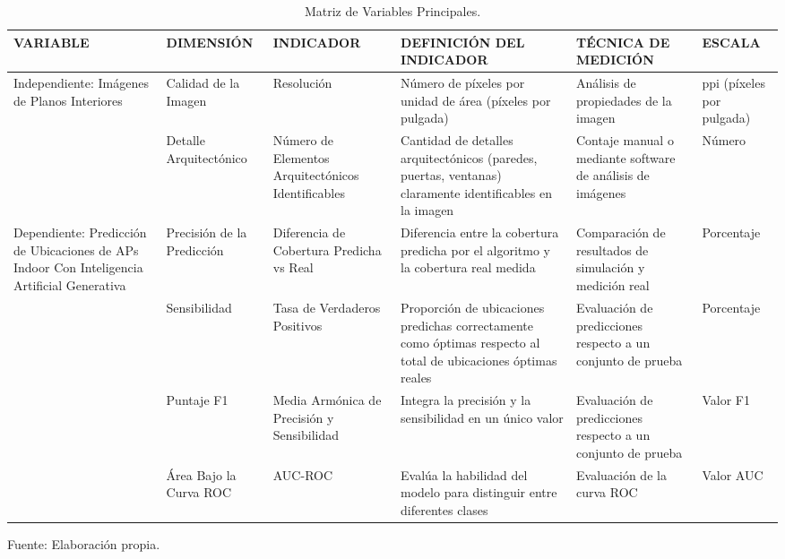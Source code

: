 \begin{longtable}{>{\raggedright\arraybackslash}m{3cm} >{\raggedright\arraybackslash}m{2cm} >{\raggedright\arraybackslash}m{2cm} >{\raggedright\arraybackslash}m{3cm} >{\raggedright\arraybackslash}m{2cm} >{\raggedright\arraybackslash}m{2.5cm}}
    \caption{Matriz de Variables Principales.}
    \label{tabla:variables}\\
    \hline
    VARIABLE & DIMENSIÓN & INDICADOR & DEFINICIÓN DEL INDICADOR & TÉCNICA DE MEDICIÓN & ESCALA \\
    \hline
    Independiente: Imágenes de Planos Interiores & Calidad de la Imagen & Resolución & Número de píxeles por unidad de área (píxeles por pulgada) & Análisis de propiedades de la imagen & ppi (píxeles por pulgada) \\
    \cline{2-6}
     & Detalle Arquitectónico & Número de Elementos Arquitectónicos Identificables & Cantidad de detalles arquitectónicos (paredes, puertas, ventanas) claramente identificables en la imagen & Contaje manual o mediante software de análisis de imágenes & Número \\
    \hline
    Dependiente: Predicción de Ubicaciones de APs Indoor Con Inteligencia Artificial Generativa & Precisión de la Predicción & Diferencia de Cobertura Predicha vs Real & Diferencia entre la cobertura predicha por el algoritmo y la cobertura real medida & Comparación de resultados de simulación y medición real & Porcentaje \\
    \cline{2-6}
     & Sensibilidad & Tasa de Verdaderos Positivos & Proporción de ubicaciones predichas correctamente como óptimas respecto al total de ubicaciones óptimas reales & Evaluación de predicciones respecto a un conjunto de prueba & Porcentaje \\
    \cline{2-6}
     & Puntaje F1 & Media Armónica de Precisión y Sensibilidad & Integra la precisión y la sensibilidad en un único valor & Evaluación de predicciones respecto a un conjunto de prueba & Valor F1 \\
    \cline{2-6}
     & Área Bajo la Curva ROC & AUC-ROC & Evalúa la habilidad del modelo para distinguir entre diferentes clases & Evaluación de la curva ROC & Valor AUC \\
    \hline
\end{longtable}
\begin{flushleft}	%
	\small Fuente: Elaboración propia.
\end{flushleft}

